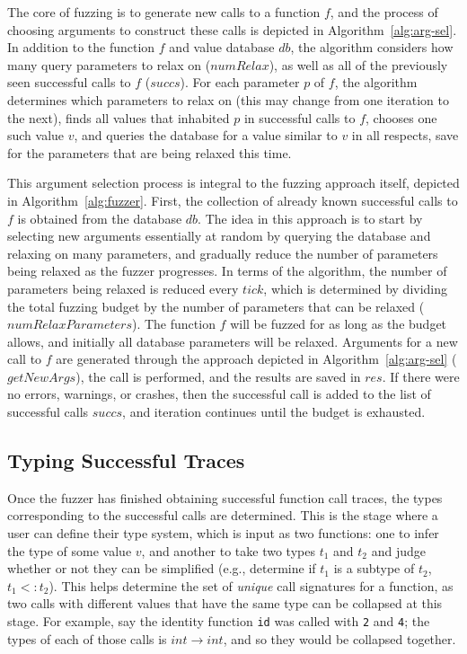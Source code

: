 \documentclass[sigplan,anonymous,review]{acmart}
\begin{document}
The core of fuzzing is to generate new calls to a function $f$, and the process of choosing arguments to construct these calls is depicted in Algorithm~\ref{alg:arg-sel}.
In addition to the function $f$ and value database $db$, the algorithm considers how many query parameters to relax on ($numRelax$), as well as all of the previously seen successful calls to $f$ ($succs$).
For each parameter $p$ of $f$, the algorithm determines which parameters to relax on (this may change from one iteration to the next), finds all values that inhabited $p$ in successful calls to $f$, chooses one such value $v$, and queries the database for a value similar to $v$ in all respects, save for the parameters that are being relaxed this time.

This argument selection process is integral to the fuzzing approach itself, depicted in Algorithm~\ref{alg:fuzzer}.
First, the collection of already known successful calls to $f$ is obtained from the database $db$.
The idea in this approach is to start by selecting new arguments essentially at random by querying the database and relaxing on many parameters, and gradually reduce the number of parameters being relaxed as the fuzzer progresses.
In terms of the algorithm, the number of parameters being relaxed is reduced every $tick$, which is determined by dividing the total fuzzing budget by the number of parameters that can be relaxed ($numRelaxParameters$).
The function $f$ will be fuzzed for as long as the budget allows, and initially all database parameters will be relaxed.
Arguments for a new call to $f$ are generated through the approach depicted in Algorithm~\ref{alg:arg-sel} ($getNewArgs$), the call is performed, and the results are saved in $res$.
If there were no errors, warnings, or crashes, then the successful call is added to the list of successful calls $succs$, and iteration continues until the budget is exhausted.



\subsection{Typing Successful Traces}

Once the fuzzer has finished obtaining successful function call traces, the types corresponding to the successful calls are determined.
This is the stage where a user can define their type system, which is input as two functions: one to infer the type of some value $v$, and another to take two types $t_1$ and $t_2$ and judge whether or not they can be simplified (e.g., determine if $t_1$ is a subtype of $t_2$, $t_1 <: t_2$).
This helps determine the set of \textit{unique} call signatures for a function, as two calls with different values that have the same type can be collapsed at this stage.
For example, say the identity function {\tt id} was called with {\tt 2} and {\tt 4}; the types of each of those calls is $int \rightarrow int$, and so they would be collapsed together. 
\end{document}
